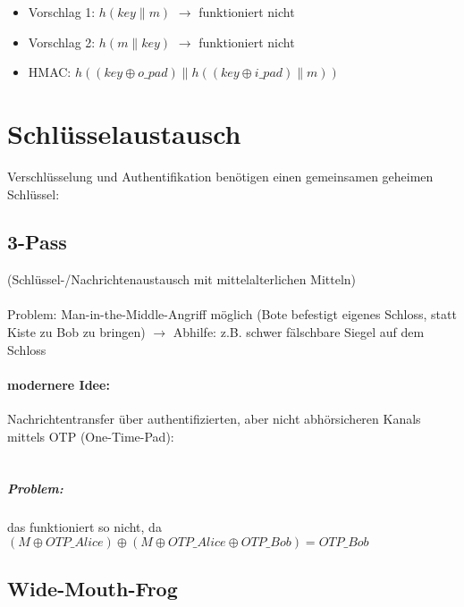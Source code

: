 \documentclass[a4paper,twoside,DIV15,BCOR12mm]{scrbook}
\begin{document}
\begin{itemize}
	\item Vorschlag 1: $h(key \| m)$ $\rightarrow$ funktioniert nicht 
	\item Vorschlag 2: $h(m \| key)$ $\rightarrow$ funktioniert nicht 
	\item HMAC: $h((key \oplus o\_pad) \| h((key \oplus i\_pad) \| m))$
\end{itemize}



\chapter{Schlüsselaustausch}

Verschlüsselung und Authentifikation benötigen einen gemeinsamen geheimen Schlüssel:

\section{3-Pass}

(Schlüssel-/Nachrichtenaustausch mit mittelalterlichen Mitteln)\\

\\

Problem: Man-in-the-Middle-Angriff möglich (Bote befestigt eigenes Schloss, statt Kiste zu Bob zu bringen) $\rightarrow$ Abhilfe: z.B. schwer fälschbare Siegel auf dem Schloss

\subsubsection{modernere Idee:}

Nachrichtentransfer über authentifizierten, aber nicht abhörsicheren Kanals mittels OTP (One-Time-Pad):\\

\\

\paragraph{Problem:} das funktioniert so nicht, da $(M \oplus OTP\_Alice) \oplus (M \oplus OTP\_Alice \oplus OTP\_Bob) = OTP\_Bob$

\section{Wide-Mouth-Frog}
\end{document}
